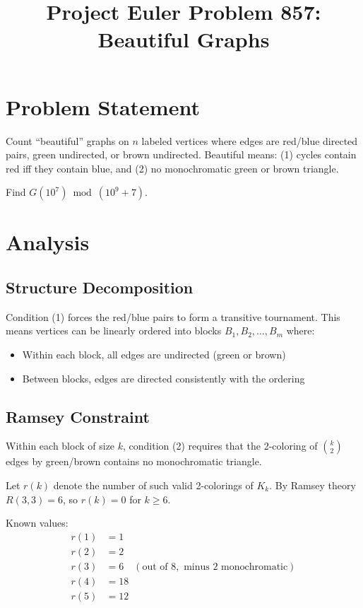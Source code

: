 \documentclass[12pt]{article}
\title{Project Euler Problem 857: Beautiful Graphs}
\author{}
\date{}
\begin{document}
\maketitle

\section{Problem Statement}
Count ``beautiful'' graphs on $n$ labeled vertices where edges are red/blue directed pairs, green undirected, or brown undirected. Beautiful means: (1) cycles contain red iff they contain blue, and (2) no monochromatic green or brown triangle.

Find $G(10^7) \bmod (10^9+7)$.

\section{Analysis}

\subsection{Structure Decomposition}
Condition (1) forces the red/blue pairs to form a transitive tournament. This means vertices can be linearly ordered into blocks $B_1, B_2, \ldots, B_m$ where:
\begin{itemize}
    \item Within each block, all edges are undirected (green or brown)
    \item Between blocks, edges are directed consistently with the ordering
\end{itemize}

\subsection{Ramsey Constraint}
Within each block of size $k$, condition (2) requires that the 2-coloring of $\binom{k}{2}$ edges by green/brown contains no monochromatic triangle.

Let $r(k)$ denote the number of such valid 2-colorings of $K_k$. By Ramsey theory $R(3,3)=6$, so $r(k)=0$ for $k \geq 6$.

Known values:
\begin{align}
r(1) &= 1 \\
r(2) &= 2 \\
r(3) &= 6 \quad (\text{out of } 8, \text{ minus 2 monochromatic}) \\
r(4) &= 18 \\
r(5) &= 12
\end{align}
\end{document}
